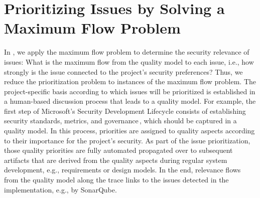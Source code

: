 \section{Prioritizing Issues by Solving a Maximum Flow Problem}
\label{sec:approach}
%
In \appr, we apply the maximum flow problem to determine the security relevance of issues:
What is the maximum flow from the quality model to each issue, i.e., how strongly is the issue connected to the project's security preferences?
Thus, we reduce the prioritization problem to instances of the maximum flow problem.
The project-specific basis according to which issues will be prioritized is established in a human-based discussion process that leads to a quality model.
For example, the first step of Microsoft's Security Development Lifecycle consists of establishing security standards, metrics, and governance\,\cite{howard2006security}, which should be captured in a quality model.
In this process, priorities are assigned to quality aspects according to their importance for the project's security.
As part of the issue prioritization, those quality priorities are fully automated propagated over to subsequent artifacts that are derived from the quality aspects during regular system development, e.g., requirements or design models.
In the end, relevance flows from the quality model along the trace links to the issues detected in the implementation, e.g., by SonarQube.

